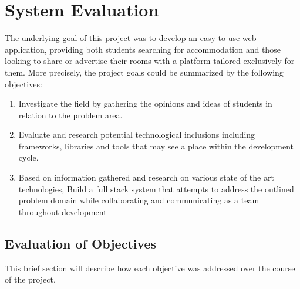 \chapter{System Evaluation}
The underlying goal of this project was to develop an easy to use web-application, providing both students searching for accommodation and those looking to share or advertise their rooms with a platform tailored exclusively for them. More precisely, the project goals could be summarized by the following objectives: 

\begin{enumerate}
  \item Investigate the field by gathering the opinions and ideas of students in relation to the problem area.
  
  \item Evaluate and research potential technological inclusions including frameworks, libraries and tools that may see a place within the development cycle.
    
  \item Based on information gathered and research on various state of the art technologies, Build a full stack system that attempts to address the outlined problem domain while collaborating and communicating as a team throughout development
\end{enumerate}

\section{Evaluation of Objectives}
This brief section will describe how each objective was addressed over the course of the project.


